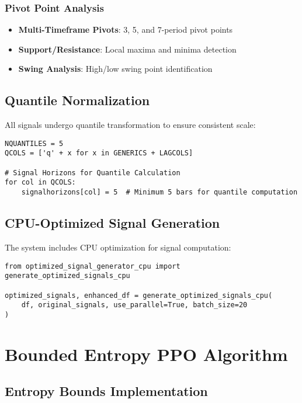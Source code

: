 \documentclass[11pt,a4paper]{article}
\begin{document}
\subsubsection{Pivot Point Analysis}
\begin{itemize}
    \item \textbf{Multi-Timeframe Pivots}: 3, 5, and 7-period pivot points
    \item \textbf{Support/Resistance}: Local maxima and minima detection
    \item \textbf{Swing Analysis}: High/low swing point identification
\end{itemize}

\subsection{Quantile Normalization}

All signals undergo quantile transformation to ensure consistent scale:

\begin{lstlisting}[caption={Quantile Processing (parameters.py:241-249)}]
NQUANTILES = 5
QCOLS = ['q' + x for x in GENERICS + LAGCOLS]

# Signal Horizons for Quantile Calculation
for col in QCOLS:
    signalhorizons[col] = 5  # Minimum 5 bars for quantile computation
\end{lstlisting}

\subsection{CPU-Optimized Signal Generation}

The system includes CPU optimization for signal computation:

\begin{lstlisting}[caption={CPU Optimization (model\_trainer.py:108-143)}]
from optimized_signal_generator_cpu import generate_optimized_signals_cpu

optimized_signals, enhanced_df = generate_optimized_signals_cpu(
    df, original_signals, use_parallel=True, batch_size=20
)
\end{lstlisting}

\section{Bounded Entropy PPO Algorithm}

\subsection{Entropy Bounds Implementation}
\end{document}
